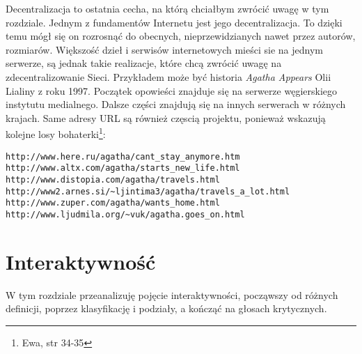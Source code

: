 \documentclass[a4paper,12pt,twoside]{article}
\begin{document}
Decentralizacja to ostatnia cecha, na którą chciałbym zwrócić uwagę
w tym rozdziale. Jednym z fundamentów Internetu jest jego decentralizacja.
To dzięki temu mógł się on rozrosnąć do obecnych, nieprzewidzianych
nawet przez autorów, rozmiarów. Większość dzieł i serwisów internetowych
mieści sie na jednym serwerze, są jednak takie realizacje, które chcą
zwrócić uwagę na zdecentralizowanie Sieci. Przykładem może być historia
\textit{Agatha Appears} Olii Lialiny z roku 1997. Początek opowieści
znajduje się na serwerze węgierskiego instytutu medialnego. Dalsze części
znajdują się na innych serwerach w różnych krajach. Same adresy URL są
również częscią projektu, ponieważ wskazują kolejne losy
bohaterki\footnote{Ewa, str 34-35}:
\begin{verbatim}
http://www.here.ru/agatha/cant_stay_anymore.htm
http://www.altx.com/agatha/starts_new_life.html
http://www.distopia.com/agatha/travels.html
http://www2.arnes.si/~ljintima3/agatha/travels_a_lot.html
http://www.zuper.com/agatha/wants_home.html
http://www.ljudmila.org/~vuk/agatha.goes_on.html
\end{verbatim}



\section{Interaktywność}
W tym rozdziale przeanalizuję pojęcie interaktywności, począwszy od
różnych definicji, poprzez klasyfikację i podziały, a kończąć na głosach
krytycznych.
\end{document}
